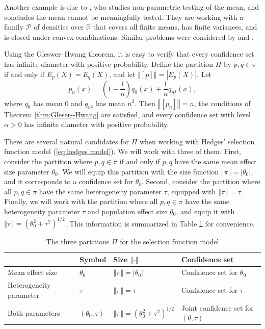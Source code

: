 \documentclass[article]{ajs}
\providecommand{\tabularnewline}{\\}
\numberwithin{equation}{section}
\numberwithin{figure}{section}
\theoremstyle{plain}
\theoremstyle{definition}
\theoremstyle{definition}
\theoremstyle{plain}
\renewcommand{\sqrt}[1]{{(#1)^{1/2}}}
\begin{document}
Another example is due to \citet{bahadur1956nonexistence}, who studies non-parametric testing of
the mean, and concludes the mean cannot be meaningfully tested. They
are working with a family $\mathcal{P}$ of densities over $\mathbb{R}$
that covers all finite means, has finite variances, and is closed
under convex combinations. Similar problems were considered by \citet{romano2004non}
and \citet{Donoho1988-hg}.

Using the Gleswer--Hwang theorem, it is easy to verify that every confidence
set has infinite diameter with positive probability. Define the partition
$\Pi$ by $p,q\in\pi$ if and only if $E_{p}(X)=E_{q}(X)$, and let
$\left\Vert [p]\right\Vert =|E_{p}(X)|$. Let
\[
p_{n}(x)=\left(1-\frac{1}{n}\right)q_{0}(x)+\frac{1}{n}q_{n^{2}}(x),
\]
where $q_{0}$ has mean $0$ and $q_{n^{2}}$ has mean $n^{2}$. Then
$\left\Vert [p_{n}]\right\Vert =n$, the conditions of Theorem \ref{thm:Gleser--Hwang}
are satisfied, and every confidence set with level $\alpha>0$ has
infinite diameter with positive probability.

There are several natural candidates for $\Pi$ when working with
Hedges' selection function model (\ref{eq:hedges model}). We will
work with three of them. First, consider the partition where $p,q\in\pi$
if and only if $p,q$ have the same mean effect size parameter $\theta_{0}$.
We will equip this partition with the size function $\left\Vert \pi\right\Vert =|\theta_{0}|$,
and it corresponds to a confidence set for $\theta_{0}$. Second,
consider the partition where all $p,q\in\pi$ have the same heterogeneity
parameter $\tau$, equipped with $\left\Vert \pi\right\Vert =\tau$.
Finally, we will work with the partition where all $p,q\in\pi$ have
the same heterogeneity parameter $\tau$ and population effect size
$\theta_{0}$, and equip it with $\left\Vert \pi\right\Vert =\sqrt{\theta_{0}^{2}+\tau^{2}}$.
This information is summarized in Table \ref{tab:Possible partitions}
for convenience. 

\begin{table}
\noindent \centering{}\caption{\label{tab:Possible partitions}The three partitions $\Pi$ for the
selection function model}
{\small{}}%
\begin{tabular}{llll}
 & {\small{}Symbol} & {\small{}Size $\left\Vert \cdot\right\Vert $} & {\small{}Confidence set}\tabularnewline
\hline 
{\small{}Mean effect size} & {\small{}$\theta_{0}$} & {\small{}$\left\Vert \pi\right\Vert =|\theta_{0}|$} & {\small{}Confidence set for $\theta_{0}$}\tabularnewline
{\small{}Heterogeneity parameter} & {\small{}$\tau$} & {\small{}$\left\Vert \pi\right\Vert =\tau$} & {\small{}Confidence set for $\tau$}\tabularnewline
Both parameters & {\small{}$(\theta_{0},\tau)$} & {\small{}$\left\Vert \pi\right\Vert =\sqrt{\theta_{0}^{2}+\tau^{2}}$} & {\small{}Joint confidence set for $(\theta,\tau)$}\tabularnewline
\end{tabular}
\end{table}
\end{document}
